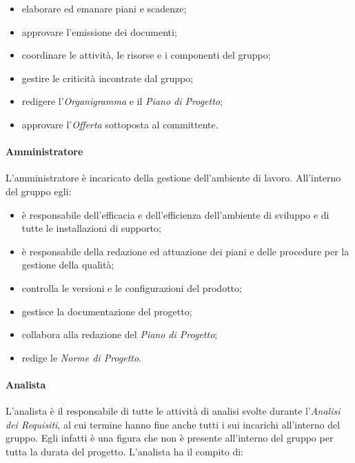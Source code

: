 			\begin{itemize}
				\item elaborare ed emanare piani e scadenze;
				\item approvare l'emissione dei documenti;
				\item coordinare le attività, le risorse e i componenti del gruppo;
				\item gestire le criticità incontrate dal gruppo;
				\item redigere l'\textit{Organigramma} e il \textit{Piano di Progetto};
				\item approvare l'\textit{Offerta} sottoposta al committente.
			\end{itemize}
		
		\paragraph{Amministratore}
		
			L'amministratore è incaricato della gestione dell'ambiente di lavoro.\newline
			All'interno del gruppo egli:
			
			\begin{itemize}
				\item è responsabile dell'efficacia e dell'efficienza dell'ambiente di sviluppo e di tutte le installazioni di supporto;
				\item è responsabile della redazione ed attuazione dei piani e delle procedure per la gestione della qualità;
				\item controlla le versioni e le configurazioni del prodotto;
				\item gestisce la documentazione del progetto;
				\item collabora alla redazione del \textit{Piano di Progetto};
				\item redige le \textit{Norme di Progetto}.
			\end{itemize}
		
		\paragraph{Analista}
		
			L'analista è il responsabile di tutte le attività di analisi svolte durante l'\textit{Analisi dei Requisiti}, al cui termine hanno fine anche tutti i sui incarichi all'interno del gruppo. Egli infatti è una figura che non è presente all'interno del gruppo per tutta la durata del progetto.\newline
			L'analista ha il compito di:
			
